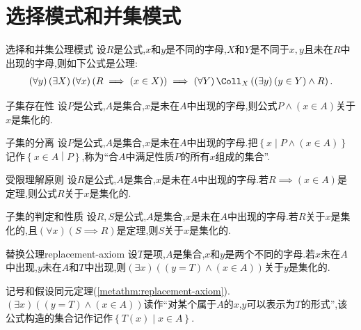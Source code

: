 \section{选择模式和并集模式}

\begin{axiom}{选择和并集公理模式}{}
	设$R$是公式,$x$和$y$是不同的字母,$X$和$Y$是不同于$x,y$且未在$R$中出现的字母,则如下公式是公理:
	\begin{align*}
		\left(\forall y\right)\left(\exists X\right)\left(\forall x\right)\left(R\implies\left(x\in X\right)\right)\implies\left(\forall Y\right)\Coll_{X}\left(\left(\exists y\right)\left(y\in Y\right)\wedge R\right).
	\end{align*}
\end{axiom}

\begin{metatheorem}{子集存在性}{}
	设$P$是公式,$A$是集合,$x$是未在$A$中出现的字母,则公式$P\wedge\left(x\in A\right)$关于$x$是集化的.
\end{metatheorem}

\begin{definition}{子集的分离}{}
	设$P$是公式,$A$是集合,$x$是未在$A$中出现的字母.把$\left\{x\middle|P\wedge\left(x\in A\right)\right\}$记作$\left\{x\in A\middle|P\right\}$,称为``合$A$中满足性质$P$的所有$x$组成的集合''.
\end{definition}

\begin{metatheorem}{受限理解原则}{}
	设$R$是公式,$A$是集合,$x$是未在$A$中出现的字母.若$R\implies\left(x\in A\right)$是定理,则公式$R$关于$x$是集化的. 
\end{metatheorem}

\begin{corollary}{子集的判定和性质}{}
	设$R,S$是公式,$A$是集合,$x$是未在$A$中出现的字母.若$R$关于$x$是集化的,且$\left(\forall x\right)\left(S\implies R\right)$是定理,则$S$关于$x$是集化的.
\end{corollary}

\begin{metatheorem}{替换公理}{replacement-axiom}
	设$T$是项,$A$是集合,$x$和$y$是两个不同的字母.若$x$未在$A$中出现,$y$未在$A$和$T$中出现,则$\left(\exists x\right)\left(\left(y=T\right)\wedge\left(x\in A\right)\right)$关于$y$是集化的.
\end{metatheorem}

\begin{definition}{}{}
	记号和假设同元定理(\cref{metathm:replacement-axiom}).$\left(\exists x\right)\left(\left(y=T\right)\wedge\left(x\in A\right)\right)$读作``对某个属于$A$的$x$,$y$可以表示为$T$的形式'',该公式构造的集合记作记作$\left\{T\left(x\right)\middle|x\in A\right\}$.
\end{definition}